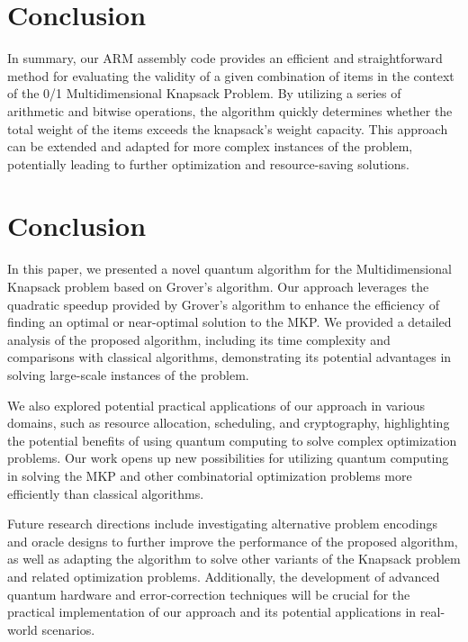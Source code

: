\section{Conclusion}
In summary, our ARM assembly code provides an efficient and straightforward method for evaluating the validity of a given combination of items in the context of the 0/1 Multidimensional Knapsack Problem. By utilizing a series of arithmetic and bitwise operations, the algorithm quickly determines whether the total weight of the items exceeds the knapsack's weight capacity. This approach can be extended and adapted for more complex instances of the problem, potentially leading to further optimization and resource-saving solutions.

\section{Conclusion}
\label{sec:conclusion}

In this paper, we presented a novel quantum algorithm for the Multidimensional Knapsack problem based on Grover's algorithm. Our approach leverages the quadratic speedup provided by Grover's algorithm to enhance the efficiency of finding an optimal or near-optimal solution to the MKP. We provided a detailed analysis of the proposed algorithm, including its time complexity and comparisons with classical algorithms, demonstrating its potential advantages in solving large-scale instances of the problem.

We also explored potential practical applications of our approach in various domains, such as resource allocation, scheduling, and cryptography, highlighting the potential benefits of using quantum computing to solve complex optimization problems. Our work opens up new possibilities for utilizing quantum computing in solving the MKP and other combinatorial optimization problems more efficiently than classical algorithms.

Future research directions include investigating alternative problem encodings and oracle designs to further improve the performance of the proposed algorithm, as well as adapting the algorithm to solve other variants of the Knapsack problem and related optimization problems. Additionally, the development of advanced quantum hardware and error-correction techniques will be crucial for the practical implementation of our approach and its potential applications in real-world scenarios.

